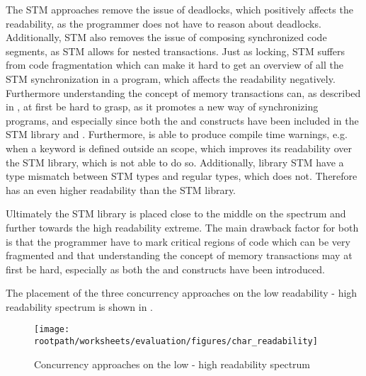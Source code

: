 The \ac{STM} approaches remove the issue of deadlocks, which positively affects the readability, as the programmer does not have to reason about deadlocks. Additionally, \ac{STM} also removes the issue of composing synchronized code segments, as \ac{STM} allows for nested transactions. Just as locking, \ac{STM} suffers from code fragmentation which can make it hard to get an overview of all the \ac{STM} synchronization in a program, which affects the readability negatively. Furthermore understanding the concept of memory transactions can, as described in \cite{rossbach2010transactional}, at first be hard to grasp, as it promotes a new way of synchronizing programs, and especially since both the  and  constructs have been included in the \ac{STM} library and \stmname. Furthermore, \stmname is able to produce compile time warnings, e.g. when a  keyword is defined outside an  scope, which improves its readability over the \ac{STM} library, which is not able to do so. Additionally, library \ac{STM} have a type mismatch between \ac{STM} types and regular types, which \stmname does not. Therefore \stmname has an even higher readability than the \ac{STM} library.

Ultimately the \ac{STM} library is placed close to the middle on the spectrum and \stmname further towards the high readability extreme. The main drawback factor for both is that the programmer have to mark critical regions of code which can be very fragmented and that understanding the concept of memory transactions may at first be hard, especially as both the  and  constructs have been introduced.

The placement of the three concurrency approaches on the low readability - high readability spectrum is shown in .

\begin{figure}[htbp]
\centering
 \texttt{[image: \\rootpath/worksheets/evaluation/figures/char\_readability]} 
 \caption{Concurrency approaches on the low - high readability spectrum}
\label{fig:char_readability}
\end{figure}

